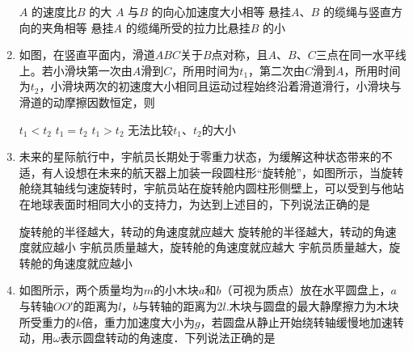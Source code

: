 \begin{enumerate}[leftmargin=0em]
\begin{minipage}[h!]{0.7\linewidth}
\vspace{0.3em}
\fourchoices
{$ A $ 的速度比$ B $ 的大}
{$ A $ 与$ B $ 的向心加速度大小相等}
{悬挂$ A $、$ B $ 的缆绳与竖直方向的夹角相等}
{悬挂$ A $ 的缆绳所受的拉力比悬挂$ B $ 的小}
\vspace{0.3em}
\end{minipage}
\hfill
\begin{minipage}[h!]{0.3\linewidth}
\flushright
\vspace{0.3em}

\vspace{0.3em}
\end{minipage}



\item 
{}
如图，在竖直平面内，滑道$ ABC $关于$ B $点对称，且$ A $、$ B $、$ C $三点在同一水平线上。若小滑块第一次由$ A $滑到$ C $，所用时间为$ t_{1} $，第二次由$ C $滑到$ A $，所用时间为$ t_{2} $，小滑块两次的初速度大小相同且运动过程始终沿着滑道滑行，小滑块与滑道的动摩擦因数恒定，则  
\begin{figure}[h!]
\centering

\end{figure}

\fourchoices
{$ t_{1} < t_{2} $ }
{$ t_{1} = t_{2} $}
{$ t_{1} > t_{2} $ }
{无法比较$ t_{1} $、$ t_{2} $的大小}


\item 
{}
未来的星际航行中，宇航员长期处于零重力状态，为缓解这种状态带来的不适，有人设想在未来的航天器上加装一段圆柱形“旋转舱”，如图所示，当旋转舱绕其轴线匀速旋转时，宇航员站在旋转舱内圆柱形侧壁上，可以受到与他站在地球表面时相同大小的支持力，为达到上述目的，下列说法正确的是  
\begin{figure}[h!]
\centering

\end{figure}

\fourchoices
{旋转舱的半径越大，转动的角速度就应越大}
{旋转舱的半径越大，转动的角速度就应越小}
{宇航员质量越大，旋转舱的角速度就应越大}
{宇航员质量越大，旋转舱的角速度就应越小}


\item 
{}
如图所示，两个质量均为$ m $的小木块$ a $和$ b $（可视为质点）放在水平圆盘上，$ a $与转轴$ OO $′的距离为$ l $，$ b $与转轴的距离为$ 2l $.木块与圆盘的最大静摩擦力为木块所受重力的$ k $倍，重力加速度大小为$ g $，若圆盘从静止开始绕转轴缓慢地加速转动，用$ \omega $表示圆盘转动的角速度．下列说法正确的是  
\begin{figure}[h!]
\centering

\end{figure}


\end{enumerate}
